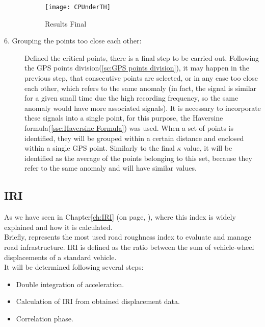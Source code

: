 \documentclass[tesi]{subfiles}
\begin{document}
\begin{description}
\begin{figure}[H]
\texttt{[image: CPUnderTH]}
\caption{Results Final}
\end{figure}\label{fig:Critical Points Final Result}
\item[6. Grouping the points too close each other:]  Defined the critical points, there is a final step to be carried out. Following the GPS points division(\ref{sc:GPS points division}), it may happen in the previous step, that consecutive points are selected, or in any case too close each other, which refers to the same anomaly (in fact, the signal is similar for a given small time due the high recording frequency, so the same anomaly would have more associated signals). It is necessary to incorporate these signals into a single point, for this purpose, the Haversine formula(\ref{ssc:Haversine Formula}) was used. When a set of points is identified, they will be grouped within a certain distance and enclosed within a single GPS point. Similarly to the final $\kappa$ value, it will be identified as the average of the points belonging to this set, because they refer to the same anomaly and will have similar values.
\end{description}





\subsection{IRI}\label{ssc:IRI}
As we have seen in Chapter\ref{ch:IRI} (on page, \pageref{ch:IRI}), where this index is widely explained and how it is calculated.\\

\noindent Briefly, represents the most used road roughness index to evaluate and manage road infrastructure. IRI is defined as the ratio between the sum of vehicle-wheel displacements of a standard vehicle.\\

\noindent It will be determined following several steps:

\begin{itemize}
\item Double integration of acceleration.
\item Calculation of IRI from obtained displacement data.
\item Correlation phase.
\end{itemize}
\end{document}
